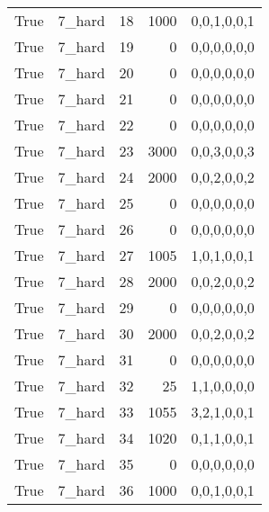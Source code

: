 \begin{tabular}{llrrl}
 True            & 7\_hard              &            18 &                  1000 & 0,0,1,0,0,1   \\
 True            & 7\_hard              &            19 &                     0 & 0,0,0,0,0,0   \\
 True            & 7\_hard              &            20 &                     0 & 0,0,0,0,0,0   \\
 True            & 7\_hard              &            21 &                     0 & 0,0,0,0,0,0   \\
 True            & 7\_hard              &            22 &                     0 & 0,0,0,0,0,0   \\
 True            & 7\_hard              &            23 &                  3000 & 0,0,3,0,0,3   \\
 True            & 7\_hard              &            24 &                  2000 & 0,0,2,0,0,2   \\
 True            & 7\_hard              &            25 &                     0 & 0,0,0,0,0,0   \\
 True            & 7\_hard              &            26 &                     0 & 0,0,0,0,0,0   \\
 True            & 7\_hard              &            27 &                  1005 & 1,0,1,0,0,1   \\
 True            & 7\_hard              &            28 &                  2000 & 0,0,2,0,0,2   \\
 True            & 7\_hard              &            29 &                     0 & 0,0,0,0,0,0   \\
 True            & 7\_hard              &            30 &                  2000 & 0,0,2,0,0,2   \\
 True            & 7\_hard              &            31 &                     0 & 0,0,0,0,0,0   \\
 True            & 7\_hard              &            32 &                    25 & 1,1,0,0,0,0   \\
 True            & 7\_hard              &            33 &                  1055 & 3,2,1,0,0,1   \\
 True            & 7\_hard              &            34 &                  1020 & 0,1,1,0,0,1   \\
 True            & 7\_hard              &            35 &                     0 & 0,0,0,0,0,0   \\
 True            & 7\_hard              &            36 &                  1000 & 0,0,1,0,0,1   \\

\end{tabular}

